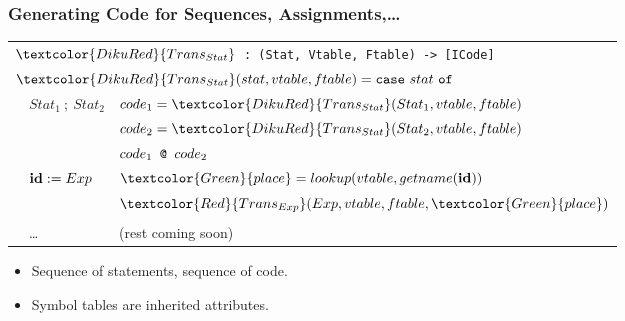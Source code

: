 \documentclass{beamer}
\newcommand{\codesize}{\footnotesize}
\newcommand{\cd}[1]{{{\codesize\tt #1}}}
\newcommand{\red}[1]{\textcolor{Red}{{#1}}}
\newcommand{\green}[1]{\textcolor{Green}{{#1}}}
\newcommand{\emp}[1]{\textcolor{DikuRed}{ #1}}
\begin{document}
\begin{frame}[fragile,t]
	\frametitle{Generating Code for Sequences, Assignments,\ldots}

\medskip

{ \footnotesize

\begin{tabular}{lll}
\multicolumn{3}{l}{
$\emp{Trans_{Stat}}$\cd{~:~(Stat, Vtable, Ftable) -> [ICode]}}\\
\multicolumn{3}{l}{
$\emp{Trans_{Stat}} (stat,vtable,ftable) = \mbox{\tt case}~stat~\mbox{\tt of}$} \\\hline

&$Stat_1~;~Stat_2$
        & $code_1 = \emp{Trans_{Stat}}(Stat_1,vtable,ftable)$ \\
&        & $code_2 = \emp{Trans_{Stat}}(Stat_2,vtable,ftable)$ \\
&        & $code_1 \mbox{\tt ~@~} code_2$ \\\hline

&${\bf id} := Exp$
        & $\green{place} = lookup(vtable,getname({\bf id}))$ \\
&        & $\red{Trans_{Exp}} (Exp,vtable,ftable,\green{place})$ \\\hline
&&\\
& \ldots  & (rest coming soon)\\
\end{tabular}
}

\begin{itemize}
\item Sequence of statements, sequence of code.
\item Symbol tables are inherited attributes.
\end{itemize}

\end{frame}
\end{document}
